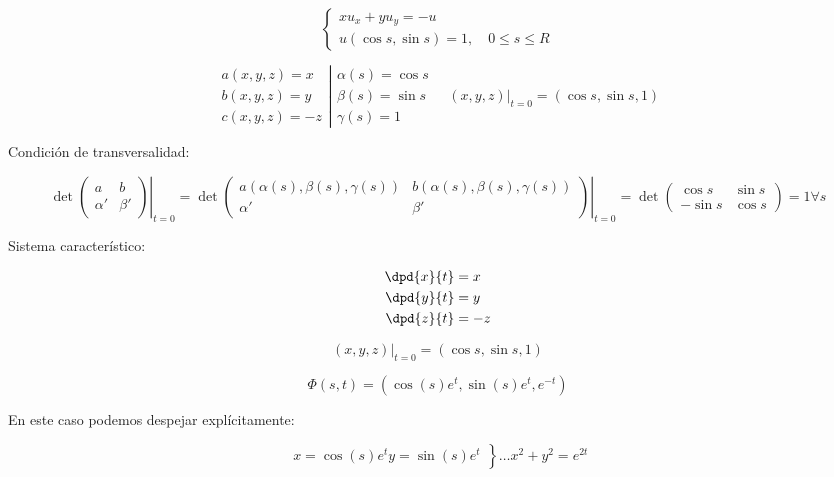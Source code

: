 	\begin{example}{5}

		\[
		\left\{
		\begin{array}{l}
			xu_x+ yu_y = -u\\
			u(\cos s, \sin s) = 1,\quad 0 \leq s \leq R
		\end{array}
		\right.
		\]

		\[ \left. \begin{array}{r}
		a(x,y,z) = x \\
		b(x,y,z) = y \\
		c(x,y,z) = -z
		\end{array} \right| \begin{array}{l}
		\alpha(s) = \cos s \\
		\beta(s) = \sin s \\
		\gamma(s) = 1 \end{array}
		\quad(x,y,z)|_{t=0} = (\cos s,\sin s,1)
		\]

		Condición de transversalidad:

		\[\det \left. \begin{pmatrix}
			a & b \\
			\alpha' & \beta'
		\end{pmatrix} \right|_{t=0} =
		\det \left. \begin{pmatrix}
			a(\alpha(s), \beta(s), \gamma(s)) & b(\alpha(s), \beta(s), \gamma(s)) \\
			\alpha' & \beta'
		\end{pmatrix} \right|_{t=0} = \det \begin{pmatrix}
			\cos s & \sin s \\
			-\sin s & \cos s
		\end{pmatrix} = 1 \forall s \]

		Sistema característico:

		\begin{align*}
			 \dpd{x}{t} &= x  \\
			 \dpd{y}{t} &= y \\
			 \dpd{z}{t} &= -z
		\end{align*}

		\[(x,y,z)|_{t=0} = (\cos s,\sin s,1)\]

		\[\Phi(s,t) = (\cos(s) e^{t}, \sin(s) e^t, e^{-t})\]

		En este caso podemos despejar explícitamente:

		\[
		\left.\begin{array}{r}
			x = \cos (s) e^t
			y = \sin (s) e^t
		\end{array}\right\} … x^2 + y^2 = e^{2t} \]


\end{example}
